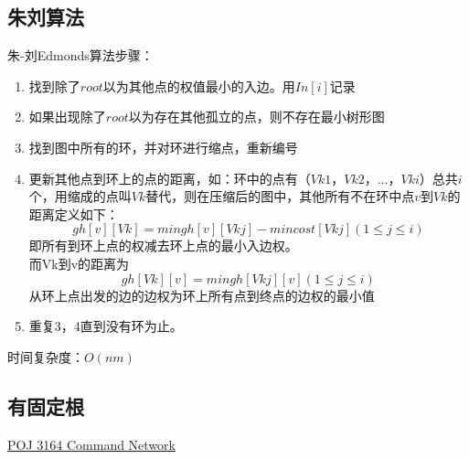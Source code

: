 \subsection{朱刘算法}
朱-刘Edmonds算法步骤：
\begin{enumerate}
\item 找到除了$root$以为其他点的权值最小的入边。用$In[i]$记录
\item 如果出现除了$root$以为存在其他孤立的点，则不存在最小树形图
\item 找到图中所有的环，并对环进行缩点，重新编号
\item 更新其他点到环上的点的距离，如：环中的点有$（Vk1，Vk2，… ，Vki）$总共$i$个，用缩成的点叫$Vk$替代，则在压缩后的图中，其他所有不在环中点$v$到$Vk$的距离定义如下：\\
$$gh[v][Vk]=min { gh[v][Vkj]-mincost[Vkj] } (1\leq j\leq i)$$
即所有到环上点的权减去环上点的最小入边权。\\
而Vk到v的距离为\\
$$gh[Vk][v]=min { gh[Vkj][v] }  (1\leq j\leq i)$$
从环上点出发的边的边权为环上所有点到终点的边权的最小值
\item 重复3，4直到没有环为止。
\end{enumerate}

时间复杂度：$O(nm)$

\subsection{有固定根}
\underline {POJ 3164 Command Network} \\


